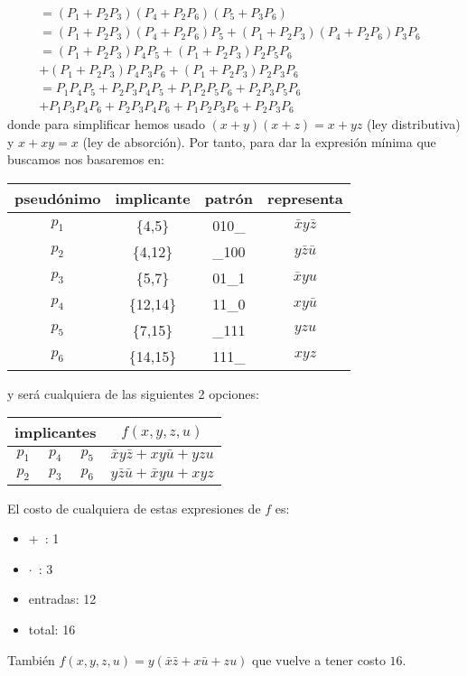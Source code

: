 \begin{solution}
\begin{enumerate}
\begin{align*}
       &=(P_{1}+P_{2}P_{3})
         (P_{4}+P_{2}P_{6})
         (P_{5}+P_{3}P_{6})&&\\
       &=(P_{1}+P_{2}P_{3})(P_{4}+P_{2}P_{6})P_{5}
       +(P_{1}+P_{2}P_{3})(P_{4}+P_{2}P_{6})P_{3}P_{6}&&\\
       &=(P_{1}+P_{2}P_{3})P_{4}P_{5}
       +(P_{1}+P_{2}P_{3})P_{2}P_{5}P_{6}&&\\
       &+(P_{1}+P_{2}P_{3})P_{4}P_{3}P_{6}
       +(P_{1}+P_{2}P_{3})P_{2}P_{3}P_{6}&&\\
       &=P_{1}P_{4}P_{5}
       +P_{2}P_{3}P_{4}P_{5}
       +P_{1}P_{2}P_{5}P_{6}
       +P_{2}P_{3}P_{5}P_{6}&&\\
       &+P_{1}P_{3}P_{4}P_{6}
       +P_{2}P_{3}P_{4}P_{6}
       +P_{1}P_{2}P_{3}P_{6}
       +P_{2}P_{3}P_{6}&&
    \end{align*}
    donde para simplificar hemos usado $(x+y)(x+z)=x+yz$ (ley
    distributiva) y $x+xy=x$ (ley de absorción). Por tanto, para dar
    la expresión mínima que buscamos nos basaremos en:
    \begin{center}
      \begin{tabular}[c]{|c|c|c|c|}
        pseudónimo&implicante&patrón&representa\\\hline
        $p_{1}$&\{4,5\}  &010{\_}&$\bar{x}y\bar{z}$\\
        $p_{2}$&\{4,12\} &{\_}100&$y\bar{z}\bar{u}$\\
        $p_{3}$&\{5,7\}  &01{\_}1&$\bar{x}yu$\\
        $p_{4}$&\{12,14\}&11{\_}0&$xy\bar{u}$\\
        $p_{5}$&\{7,15\} &{\_}111&$yzu$\\
        $p_{6}$&\{14,15\}&111{\_}&$xyz$\\\hline
      \end{tabular}
      \end{center}
      y será cualquiera de las siguientes 2 opciones:
      \begin{center}
        \begin{tabular}[c]{|ccc|c|}
          \multicolumn{3}{|c|}{implicantes}&$f(x,y,z,u)$\\[1mm]\hline
          $p_{1}$&$p_{4}$&$p_{5}$&$\bar{x}y\bar{z}+xy\bar{u}+yzu$\\
          $p_{2}$&$p_{3}$&$p_{6}$&$y\bar{z}\bar{u}+\bar{x}yu+xyz$\\
          \hline
        \end{tabular}
      \end{center}
      El costo de cualquiera de estas expresiones de $f$ es:
      \begin{itemize}
      \item +\ : 1
      \item $\cdot$\ : 3
      \item entradas: 12
      \item total: 16
      \end{itemize}
      También $f(x,y,z,u)=y(\bar{x}\bar{z}+x\bar{u}+zu)$ que vuelve a
      tener costo $16$.
  \end{enumerate}
  \end{solution}